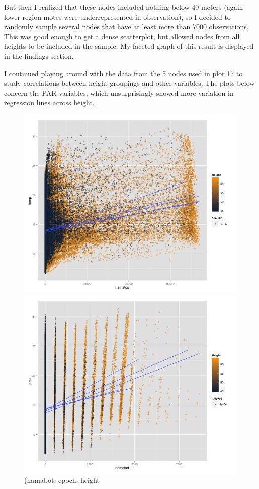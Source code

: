 \documentclass[english]{article}\usepackage[]{graphicx}\usepackage[]{color}
\begin{document}
But then I realized that these nodes included nothing below 40 meters (again lower region motes were underrepresented in observation), so I decided to randomly sample several nodes that have at least more than 7000 observations.  This was good enough to get a dense scatterplot, but allowed nodes from all heights to be included in the sample.  My faceted graph of this result is displayed in the findings section.   

I continued playing around with the data from the 5 nodes used in plot 17 to study correlations between height groupings and other variables.  The plots below concern the PAR variables, which unsurprisingly showed more variation in regression lines across height.    


\begin{figure}[H]
\centering
\begin{minipage}{.50\textwidth}
\centering
\includegraphics[width=\linewidth]{top5hama}
\caption{(hamabot, epoch, height}
\label{fig:test1}
\end{minipage}\hfill
\begin{minipage}{.50\textwidth}
\centering
\includegraphics[width=\linewidth]{top5hama2}

\end{minipage}
\end{figure}
\end{document}
